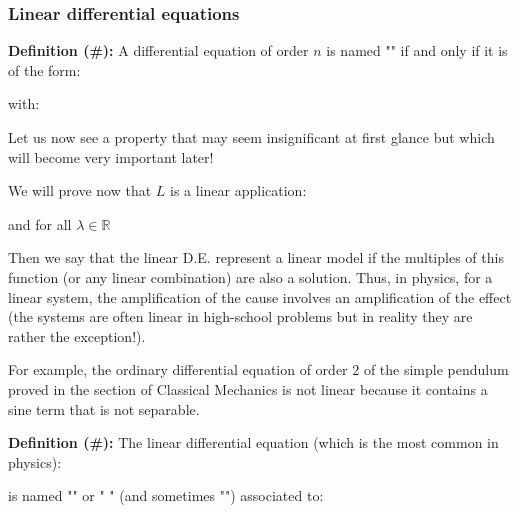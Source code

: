 	\subsubsection{Linear differential equations}\label{linear differential equations}
	\textbf{Definition (\#\mydef):} A differential equation of order $n$ is named "" if and only if it is of the form:
	
	with:
	
	Let us now see a property that may seem insignificant at first glance but which will become very important later!
	
	We will prove now that $L$ is a linear application:
	
	and for all $\lambda \in \mathbb{R}$
	
	Then we say that the linear D.E. represent a linear model if the multiples of this function (or any linear combination) are also a solution. Thus, in physics, for a linear system, the amplification of the cause involves an amplification of the effect (the systems are often linear in high-school problems but in reality they are rather the exception!).
	
	For example, the ordinary differential equation of order $2$ of the simple pendulum proved in the section of Classical Mechanics is not linear because it contains a sine term that is not separable.

	\textbf{Definition (\#\mydef):} The linear differential equation (which is the most common in physics):
	
	is named "" or " " (and sometimes "") associated to:
	
